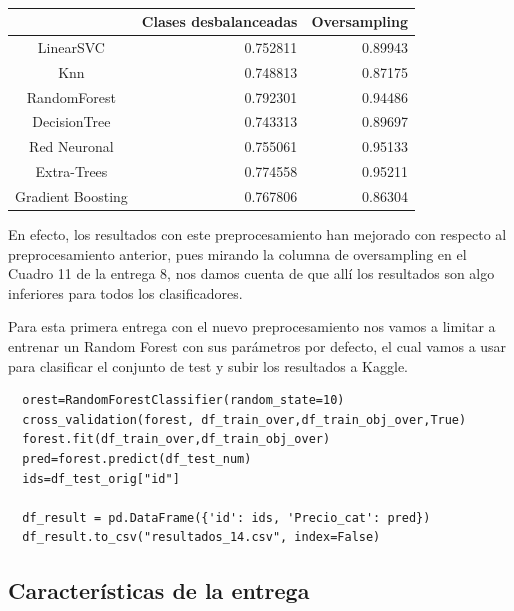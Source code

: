 \documentclass[a4paper,11pt]{article}
\begin{document}
  \begin{table}[htbp]
  	\caption{}\begin{center}
  	\begin{tabular}{|c|r|r|}
  		\hline
  		\multicolumn{1}{|l|}{} & \multicolumn{1}{l|}{\textbf{Clases desbalanceadas}} & \multicolumn{1}{l|}{\textbf{Oversampling}} \\ \hline
  		LinearSVC & 0.752811 & 0.89943 \\ \hline
  		Knn & 0.748813 & 0.87175 \\ \hline
  		RandomForest & 0.792301 & 0.94486 \\ \hline
  		DecisionTree & 0.743313 & 0.89697 \\ \hline
  		Red Neuronal & 0.755061 & 0.95133 \\ \hline
  		Extra-Trees & 0.774558 & 0.95211 \\ \hline
  		Gradient Boosting & 0.767806 & 0.86304 \\ \hline
  	\end{tabular}\end{center}
  	\label{}
  \end{table}
  
  
  En efecto, los resultados con este preprocesamiento han mejorado con respecto al preprocesamiento anterior, pues mirando la columna de oversampling en el Cuadro 11 de la entrega 8, nos damos cuenta de que allí los resultados son algo inferiores para todos los clasificadores. 
  
  Para esta primera entrega con el nuevo preprocesamiento nos vamos a limitar a entrenar un Random Forest con sus parámetros por defecto, el cual vamos a usar para clasificar el conjunto de test y subir los resultados a Kaggle.
  
  \begin{verbatim}
  orest=RandomForestClassifier(random_state=10)
  cross_validation(forest, df_train_over,df_train_obj_over,True)
  forest.fit(df_train_over,df_train_obj_over)
  pred=forest.predict(df_test_num)
  ids=df_test_orig["id"]
  
  df_result = pd.DataFrame({'id': ids, 'Precio_cat': pred})
  df_result.to_csv("resultados_14.csv", index=False)
  \end{verbatim}
  
  \subsection{Características de la entrega}
  
\end{document}
